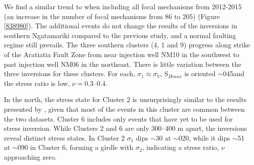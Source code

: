 We find a similar trend to \citep[][submitted]{j2019} when including all focal mechanisms from 2012-2015 (an increase in the number of focal mechanisms from 86 to 205) (Figure \ref{838980}). The additional events do not change the results of the inversions in southern Ngatamariki compared to the previous study, and a normal faulting regime still prevails. The three southern clusters (4, 1 and 9) progress along strike of the Aratiatia Fault Zone from near injection well NM10 in the southwest to past injection well NM06 in the northeast. There is little variation between the three inversions for these clusters. For each, $\sigma_{1}\approx{\sigma{_V}}$, S$_{Hmax}$ is oriented $\sim$045\textdegree and the stress ratio is low, $\nu=$0.3--0.4.

In the north, the stress state for Cluster 2 is unsurprisingly similar to the results presented by \citep[][submitted]{j2019}, given that most of the events in this cluster are common between the two datasets. Cluster 6 includes only events that have yet to be used for stress inversion. While Clusters 2 and 6 are only 300--400 m apart, the inversions reveal distinct stress states. In Cluster 2 $\sigma_{1}$ dips $\sim$30\textdegree{} at $\sim$020\textdegree{}, while it dips $\sim$51\textdegree{} at $\sim$090\textdegree{} in Cluster 6, forming a girdle with $\sigma_{2}$, indicating a stress ratio, $\nu$ approaching zero.

